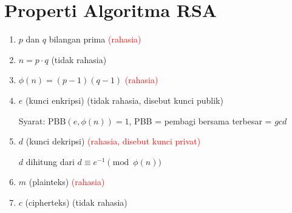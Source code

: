 \documentclass{article}
\begin{document}

\section*{Properti Algoritma RSA}

\begin{enumerate}
    \item $p$ dan $q$ bilangan prima \hfill \textcolor{red}{(rahasia)}
    \item $n = p \cdot q$ \hfill (tidak rahasia)
    \item $\phi(n) = (p - 1)(q - 1)$ \hfill \textcolor{red}{(rahasia)}
    \item $e$ (kunci enkripsi) \hfill (tidak rahasia, disebut kunci publik)

    Syarat: $\text{PBB}(e, \phi(n)) = 1$, PBB = pembagi bersama terbesar = $gcd$

    \item $d$ (kunci dekripsi) \hfill \textcolor{red}{(rahasia, disebut kunci privat)}

    $d$ dihitung dari $d \equiv e^{-1} \pmod{\phi(n)}$

    \item $m$ (plainteks) \hfill \textcolor{red}{(rahasia)}
    \item $c$ (cipherteks) \hfill (tidak rahasia)
\end{enumerate}
\end{document}
